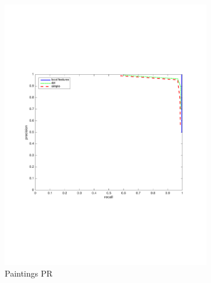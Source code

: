 \documentclass[english,12pt,a4paper,pdftex,elec,utf8, table]{aaltothesis}
\begin{document}
\begin{figure}[htb]
\begin{center}
\begin{subfigure}[b]{0.49\textwidth}
    \includegraphics[width=\textwidth]{figures/NormalizehistogramPR.pdf}
    \caption{Paintings PR}
    \label{Normalizerocthinglink}
  \end{subfigure}
  \begin{subfigure}[b]{0.49\textwidth}

\end{subfigure}
\end{center}
\end{figure}
\end{document}
